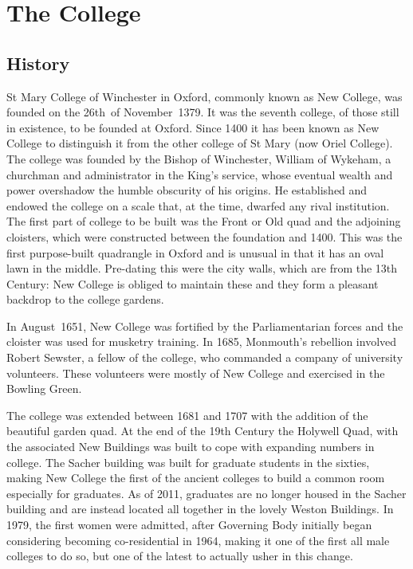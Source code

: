 
\chapter{The College}

\section{History}

St Mary College of Winchester in Oxford, commonly known as New College, was
founded on the 26th~of November~1379. It was the seventh college, of those still in existence, to be founded at Oxford. Since 1400 it has been known as New College to distinguish it from the other college of St Mary (now Oriel College). The college was founded by the Bishop of Winchester, William of Wykeham, a churchman and administrator in the King's service, whose eventual wealth and power overshadow the humble obscurity of his origins. He established and endowed the college on a scale that, at the time, dwarfed any rival institution. The first part of college to be built was the Front or Old quad and the adjoining cloisters, which were constructed between the foundation and 1400. This was the first purpose-built quadrangle in Oxford and is unusual in that it has an oval lawn in the middle. Pre-dating this were the city walls, which are from the 13th Century: New College is obliged to maintain these and they form a pleasant backdrop to the college gardens.

In August~1651, New College was fortified by the Parliamentarian forces and the cloister was used for musketry training. In 1685, Monmouth's rebellion involved Robert Sewster, a fellow of the college, who commanded a company of university volunteers. These volunteers were mostly of New College and exercised in the Bowling Green.

The college was extended between 1681 and 1707 with the addition of the beautiful garden quad. At the end of the 19th Century the Holywell Quad, with the associated New Buildings was built to cope with expanding numbers in college. The Sacher building was built for graduate students in the sixties, making New College the first of the ancient colleges to build a common room especially for graduates. As of 2011, graduates are no longer housed in the Sacher building and are instead located all together in the lovely Weston Buildings. In 1979, the first women were admitted, after Governing Body initially began considering becoming co-residential in 1964, making it one of the first all male colleges to do so, but one of the latest to actually usher in this change.

